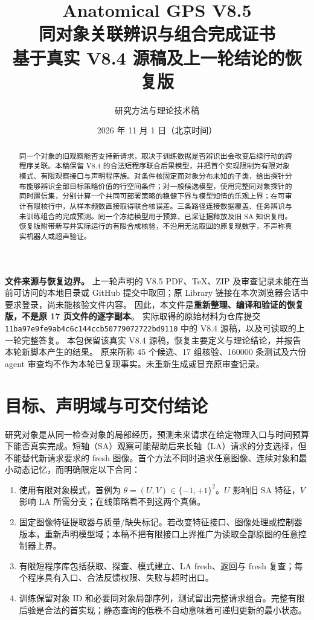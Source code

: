 \documentclass[11pt,a4paper,fontset=fandol]{ctexart}
\title{\color{ink}\bfseries Anatomical GPS V8.5\\[.3em]
\LARGE 同对象关联辨识与组合完成证书\\[.3em]
\large 基于真实 V8.4 源稿及上一轮结论的恢复版}
\author{研究方法与理论技术稿}
\date{2026 年 11 月 1 日（北京时间）}
\theoremstyle{definition}
\theoremstyle{remark}
\numberwithin{equation}{section}
\begin{document}
\maketitle
\begin{abstract}
同一个对象的旧观察能否支持新请求，取决于训练数据是否辨识出会改变后续行动的跨程序关联。本稿保留 V8.4 的合法短程序联合后果模型，并把首个实现限制为有限对象模式、有限观察接口与声明程序族。对条件核固定而对象分布未知的子类，给出探针分布能够辨识全部目标策略价值的行空间条件；对一般候选模型，使用完整同对象探针的同时置信集，分别计算一个共同可部署策略的稳健下界与模型知情的乐观上界；在可审计有限核行中，从样本频数直接取得联合核误差。三条路径连接数据覆盖、任务辨识与未训练组合的完成预测。同一个冻结模型用于预算、已采证据释放及旧 SA 知识复用。恢复版附带新写并实际运行的有限合成核验，不沿用无法取回的原复现数字，不声称真实机器人或超声验证。
\end{abstract}

\begin{scopebox}
\textbf{文件来源与恢复边界。}
上一轮声明的 V8.5 PDF、TeX、ZIP 及审查记录未能在当前可访问的本地目录或 GitHub 提交中取回；原 Library 链接在本次浏览器会话中要求登录，尚未能核验文件内容。
因此，本文件是\textbf{重新整理、编译和验证的恢复版，不是原 17 页文件的逐字副本}。
实际取得的原始材料为仓库提交
\texttt{11ba97e9fe9ab4c6c144ccb50779072722bd9110}
中的 V8.4 源稿，以及可读取的上一轮完整答复。
本包保留该真实 V8.4 源稿，恢复主要定义与理论结论，并报告本轮新脚本产生的结果。
原来所称 45 个候选、17 组核验、160000 条测试及六份 agent 审查均不作为本轮已复现事实。未重新生成或冒充原审查记录。
\end{scopebox}

\section{目标、声明域与可交付结论}
\label{sec:intro}
研究对象是从同一检查对象的局部经历，预测未来请求在给定物理入口与时间预算下能否真实完成。短轴（SA）观察可能帮助后来长轴（LA）请求的分支选择，但不能替代新请求要求的 fresh 图像。首个方法不同时追求任意图像、连续对象和最小动态记忆，而明确限定以下合同：
\begin{enumerate}
\item 使用有限对象模式，首例为 $\theta=(U,V)\in\{-1,+1\}^2$。$U$ 影响旧 SA 特征，$V$ 影响 LA 所需分支；在线策略看不到这两个真值。
\item 固定图像特征提取器与质量/缺失标记。若改变特征接口、图像处理或控制器版本，重新声明模型域；本稿不把有限接口上界推广为读取全部原图的任意控制器上界。
\item 有限短程序库包括获取、探查、模式建立、LA fresh、返回与 fresh 复查；每个程序具有入口、合法反馈权限、失败与超时出口。
\item 训练保留对象 ID 和必要同对象局部序列，测试留出完整请求组合。完整有限后验是合法的首实现；静态查询的低秩不自动意味着可递归更新的最小状态。
\end{enumerate}
\end{document}
